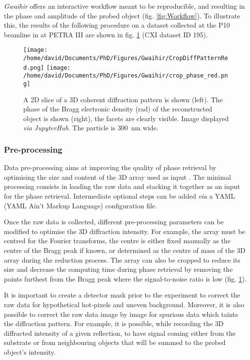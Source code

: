\textit{Gwaihir} offers an interactive workflow meant to be reproducible, and resulting in the phase and amplitude of the probed object (fig. \ref{fig:Workflow}).
To illustrate this, the results of the following procedure on a dataset collected at the P10 beamline in at PETRA III are shown in fig. \ref{fig:GUI_file} (CXI dataset ID 195).

\begin{figure}[!htb]
    \centering
    \texttt{[image: /home/david/Documents/PhD/Figures/Gwaihir/CropDiffPatternRed.png]}
    \texttt{[image: /home/david/Documents/PhD/Figures/Gwaihir/crop\_phase\_red.png]}
    \caption{
    A 2D slice of a 3D coherent diffraction pattern is shown (left).
    The phase of the Bragg electronic density (\unit{\radian}) of the reconstructed object is shown (right), the facets are clearly visible.
    Image displayed \textit{via} \textit{JupyterHub}.
    The particle is \qty{300}{\nm} wide.
    }
    \label{fig:GUI_file}
\end{figure}

\subsubsection{Pre-processing} \label{sec:preprocess}

Data pre-processing aims at improving the quality of phase retrieval by optimising the size and content of the 3D array used as input \parencite{Ozturk2017}.
The minimal processing consists in loading the raw data and stacking it together as an input for the phase retrieval.
Intermediate optional steps can be added \textit{via} a YAML (YAML Ain't Markup Language) configuration file.

Once the raw data is collected, different pre-processing parameters can be modified to optimise the 3D diffraction intensity.
For example, the array must be centred for the Fourier transforms, the centre is either fixed manually as the centre of the Bragg peak if known, or determined as the centre of mass of the 3D array during the reduction process.
The array can also be cropped to reduce its size and decrease the computing time during phase retrieval by removing the points furthest from the Bragg peak where the signal-to-noise ratio is low (fig. \ref{fig:GUI_file}).

It is important to create a detector mask prior to the experiment to correct the raw data for hypothetical hot-pixels and uneven background.
Moreover, it is also possible to correct the raw data image by image for spurious data which taints the diffraction pattern.
For example, it is possible, while recording the 3D diffracted intensity of a given reflection, to have signal coming either from the substrate or from neighbouring objects that will be summed to the probed object's intensity.

